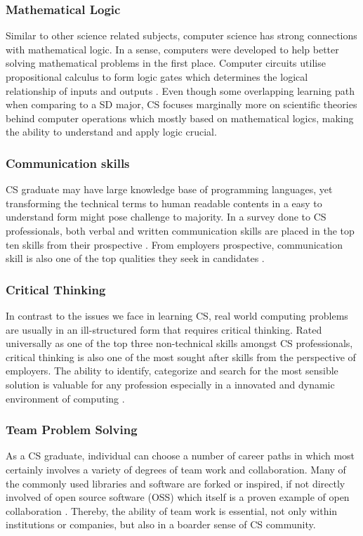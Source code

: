 \documentclass[a4paper, 11pt]{report}
\begin{document}
\subsubsection{Mathematical Logic}
Similar to other science related subjects, computer science has strong connections with mathematical logic. In a sense, computers were developed to help better solving mathematical problems in the first place. Computer circuits utilise propositional calculus to form logic gates which determines the logical relationship of inputs and outputs \cite{ben2012mathematical}. Even though some overlapping learning path when comparing to a SD major, CS focuses marginally more on scientific theories behind computer operations which mostly based on mathematical logics, making the ability to understand and apply logic crucial.
\subsubsection{Communication skills}
CS graduate may have large knowledge base of programming languages, yet transforming the technical terms to human readable contents in a easy to understand form might pose challenge to majority. In a survey done to CS professionals, both verbal and written communication skills are placed in the top ten skills from their prospective \cite{exter2018comparing}. From employers prospective, communication skill is also one of the top qualities they seek in candidates \cite{lundberg2021employable}.
\subsubsection{Critical Thinking}
In contrast to the issues we face in learning CS, real world computing problems are usually in an ill-structured form that requires critical thinking. Rated universally as one of the top three non-technical skills amongst CS professionals, critical thinking is also one of the most sought after skills from the perspective of employers. The ability to identify, categorize and search for the most sensible solution is valuable for any profession especially in a innovated and dynamic environment of computing \cite{baird2019employers}. 
\subsubsection{Team Problem Solving}
As a CS graduate, individual can choose a number of career paths in which most certainly involves a variety of degrees of team work and collaboration. Many of the commonly used libraries and software are forked or inspired, if not directly involved of open source software (OSS) which itself is a proven example of open collaboration \cite{levine2014open}. Thereby, the ability of team work is essential, not only within institutions or companies, but also in a boarder sense of CS community.
\end{document}
